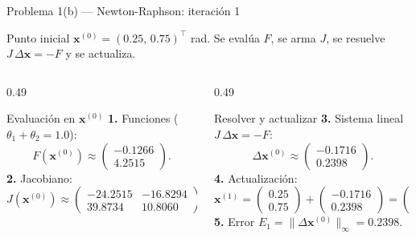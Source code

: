 \documentclass[aspectratio=169,10pt]{beamer}
\begin{document}
\begin{frame}{Problema 1(b) — Newton-Raphson: iteración 1}
\begin{cardnota}[\faPlay]
{\footnotesize Punto inicial $\mathbf x^{(0)}=(0.25,\,0.75)^{\!\top}$ rad. Se evalúa $F$, se arma $J$, se resuelve $J\,\Delta\mathbf x=-F$ y se actualiza.}
\end{cardnota}
\vspace{1mm}
\begin{columns}[T]
\begin{column}{0.49\textwidth}
\begin{cardgear}{Evaluación en $\mathbf x^{(0)}$}{\faCalculator}
{\footnotesize
\textbf{1.} Funciones ($\theta_1{+}\theta_2=1.0$):
\[
F(\mathbf x^{(0)})\approx\begin{pmatrix}-0.1266\\ 4.2515\end{pmatrix}.
\]
\textbf{2.} Jacobiano:
\[
J(\mathbf x^{(0)})\approx\begin{pmatrix}-24.2515 & -16.8294\\ 39.8734 & 10.8060\end{pmatrix}.
\]}
\end{cardgear}
\end{column}
\begin{column}{0.49\textwidth}
\begin{cardgear}{Resolver y actualizar}{\faArrowRight}
{\footnotesize
\textbf{3.} Sistema lineal $J\,\Delta\mathbf x=-F$:
\[
\Delta\mathbf x^{(0)}\approx\begin{pmatrix}-0.1716\\ 0.2398\end{pmatrix}.
\]
\textbf{4.} Actualización:
\[
\mathbf x^{(1)}=\begin{pmatrix}0.25\\0.75\end{pmatrix}+\begin{pmatrix}-0.1716\\0.2398\end{pmatrix}=\begin{pmatrix}0.0784\\0.9898\end{pmatrix}.
\]
\textbf{5.} Error $E_1=\lVert\Delta\mathbf x^{(0)}\rVert_\infty=0.2398$.}
\end{cardgear}
\end{column}
\end{columns}
\end{frame}
\end{document}
